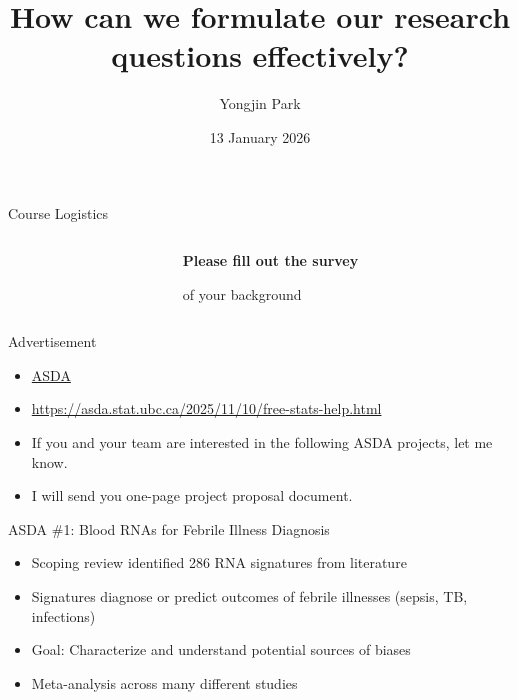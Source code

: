\documentclass[
  12pt,
  ignorenonframetext,
  aspectratio=169]{beamer}
\title{\texorpdfstring{How can we formulate our research questions
effectively?}{How can we formulate our research questions effectively?}}
\author{\texorpdfstring{Yongjin Park}{Yongjin Park}}
\date{13 January 2026}
\providecommand{\tightlist}{%
  \setlength{\itemsep}{0pt}\setlength{\parskip}{0pt}}
\begin{document}
\frame{\titlepage}

\begin{frame}{Course Logistics}
\protect{}\label{course-logistics}
\begin{columns}[T]
\begin{column}{.2\linewidth}
\end{column}

\begin{column}{.7\linewidth}
\Large

\textbf{Please fill out the survey}

of your background
\end{column}
\end{columns}
\end{frame}

\begin{frame}{Advertisement}
\protect{}\label{advertisement}
\Large

\begin{itemize}
\tightlist
\item
  \href{https://asda.stat.ubc.ca/}{ASDA}
\end{itemize}

\normalsize

\begin{itemize}
\item
  \url{https://asda.stat.ubc.ca/2025/11/10/free-stats-help.html}
\item
  If you and your team are interested in the following ASDA projects,
  let me know.
\item
  I will send you one-page project proposal document.
\end{itemize}
\end{frame}

\begin{frame}{ASDA \#1: Blood RNAs for Febrile Illness Diagnosis}
\protect{}\label{asda-1-blood-rnas-for-febrile-illness-diagnosis}
\begin{itemize}
\item
  Scoping review identified 286 RNA signatures from literature
\item
  Signatures diagnose or predict outcomes of febrile illnesses (sepsis,
  TB, infections)
\item
  Goal: Characterize and understand potential sources of biases
\item
  Meta-analysis across many different studies
\end{itemize}
\end{frame}
\end{document}
